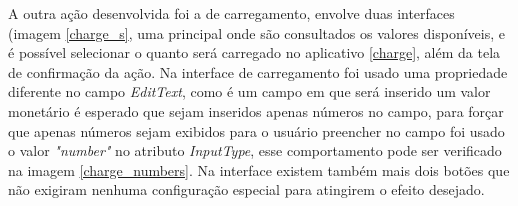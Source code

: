 \documentclass[hidelinks,12pt]{article}
\begin{document}
A outra a\c{c}\~ao desenvolvida foi a de carregamento, envolve duas interfaces (imagem \ref{charge_s}, uma principal onde s\~ao consultados os valores dispon\'iveis, e \'e poss\'ivel selecionar o quanto ser\'a carregado no aplicativo \ref{charge}, al\'em da tela de confirma\c{c}\~ao da a\c{c}\~ao. Na interface de carregamento foi usado uma propriedade diferente no campo \textit{EditText}, como \'e um campo em que ser\'a inserido um valor monet\'ario \'e esperado que sejam inseridos apenas n\'umeros no campo, para for\c{c}ar que apenas n\'umeros sejam exibidos para o usu\'ario preencher no campo foi usado o valor \textit{"number"} no atributo \textit{InputType}, esse comportamento pode ser verificado na imagem \ref{charge_numbers}. Na interface existem tamb\'em mais dois bot\~oes que n\~ao exigiram nenhuma configura\c{c}\~ao especial para atingirem o efeito desejado.
\end{document}
